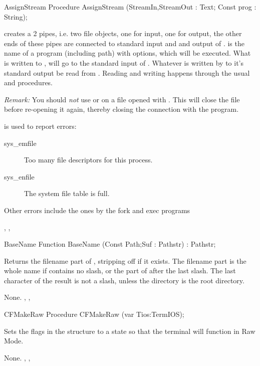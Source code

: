 \begin{procedure}{AssignStream}
\Declaration
Procedure AssignStream (StreamIn,StreamOut : Text; Const prog : String);

\Description
{} creates a 2 pipes, i.e. two file objects, one for input, one for
output, the other ends of these pipes are connected to standard input and and
output of .  is the name of a program (including path)
with options, which will be executed.
What is written to , will go to the standard input of
. Whatever is written by  to it's standard output be read from
.
Reading and writing happens through the usual  and
 procedures.

{\em Remark:} You should {\em not} use  or  on a 
file opened with . This will close the file before re-opening 
it again, thereby closing the connection with the program.

\Errors
  is used to report errors:
\begin{description}
\item[sys\_emfile] Too many file descriptors for this process.
\item[sys\_enfile] The system file table is full.
\end{description}
Other errors include the ones by the fork and exec programs

\SeeAlso
{}, ,
\end{procedure}
\begin{function}{BaseName}
\Declaration
Function BaseName (Const Path;Suf : Pathstr) : Pathstr;

\Description
Returns the filename part of , stripping off  if it
exists.
The filename part is the whole name if  contains no slash,
or the part of  after the last slash.
The last character of the result is not a slash, unless the directory is the
root directory.

\Errors
None.
\SeeAlso
{}, , 
\end{function}
\begin{procedure}{CFMakeRaw}
\Declaration
Procedure CFMakeRaw (var Tios:TermIOS);

\Description
  Sets the flags in the  structure  to a state so that 
  the terminal will function in Raw Mode.

\Errors
None.
\SeeAlso
 , , 
\end{procedure}
